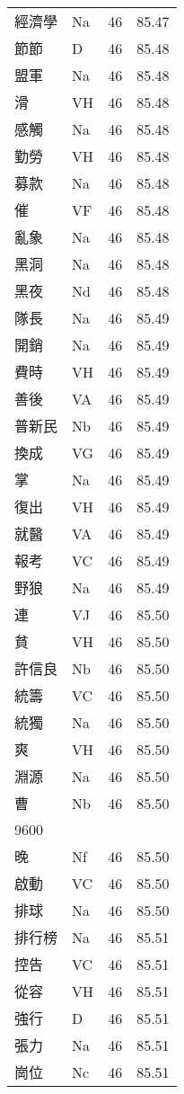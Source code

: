 \documentclass[twocolumn]{book}
\begin{document}
\begin{supertabular}{llrr}
經濟學 & Na & 46 &  85.47\\
節節 & D & 46 &  85.48\\
盟軍 & Na & 46 &  85.48\\
滑 & VH & 46 &  85.48\\
感觸 & Na & 46 &  85.48\\
勤勞 & VH & 46 &  85.48\\
募款 & Na & 46 &  85.48\\
催 & VF & 46 &  85.48\\
亂象 & Na & 46 &  85.48\\
黑洞 & Na & 46 &  85.48\\
黑夜 & Nd & 46 &  85.48\\
隊長 & Na & 46 &  85.49\\
開銷 & Na & 46 &  85.49\\
費時 & VH & 46 &  85.49\\
善後 & VA & 46 &  85.49\\
普新民 & Nb & 46 &  85.49\\
換成 & VG & 46 &  85.49\\
掌 & Na & 46 &  85.49\\
復出 & VH & 46 &  85.49\\
就醫 & VA & 46 &  85.49\\
報考 & VC & 46 &  85.49\\
野狼 & Na & 46 &  85.49\\
連 & VJ & 46 &  85.50\\
貧 & VH & 46 &  85.50\\
許信良 & Nb & 46 &  85.50\\
統籌 & VC & 46 &  85.50\\
統獨 & Na & 46 &  85.50\\
爽 & VH & 46 &  85.50\\
淵源 & Na & 46 &  85.50\\
曹 & Nb & 46 &  85.50\\
9600\\
晚 & Nf & 46 &  85.50\\
啟動 & VC & 46 &  85.50\\
排球 & Na & 46 &  85.50\\
排行榜 & Na & 46 &  85.51\\
控告 & VC & 46 &  85.51\\
從容 & VH & 46 &  85.51\\
強行 & D & 46 &  85.51\\
張力 & Na & 46 &  85.51\\
崗位 & Nc & 46 &  85.51\\

\end{supertabular}
\end{document}
